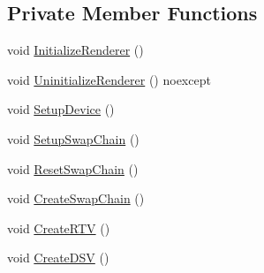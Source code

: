 \subsection*{Private Member Functions}
\begin{DoxyCompactItemize}
\item 
void \hyperlink{classmage_1_1_renderer_a2bb7f4e41ef6db047ce3023ed4e5d0c1}{Initialize\+Renderer} ()
\item 
void \hyperlink{classmage_1_1_renderer_a28c76b49e51e49e58fdeb0b72b12f3b6}{Uninitialize\+Renderer} () noexcept
\item 
void \hyperlink{classmage_1_1_renderer_aedf5e2e3f73d3d05c09c5fc9f8ac06c3}{Setup\+Device} ()
\item 
void \hyperlink{classmage_1_1_renderer_a8d3030611390f69120f1e5b91225eddf}{Setup\+Swap\+Chain} ()
\item 
void \hyperlink{classmage_1_1_renderer_a1c4615559503b339a9cdc6ac17e1e858}{Reset\+Swap\+Chain} ()
\item 
void \hyperlink{classmage_1_1_renderer_a1bd77bf54ea3a7867691785efd183013}{Create\+Swap\+Chain} ()
\item 
void \hyperlink{classmage_1_1_renderer_a140f8bfcf5c30343791f0187f5caef14}{Create\+R\+TV} ()
\item 
void \hyperlink{classmage_1_1_renderer_a0616cdfae1dda026b29785b422e220a3}{Create\+D\+SV} ()
\end{DoxyCompactItemize}
